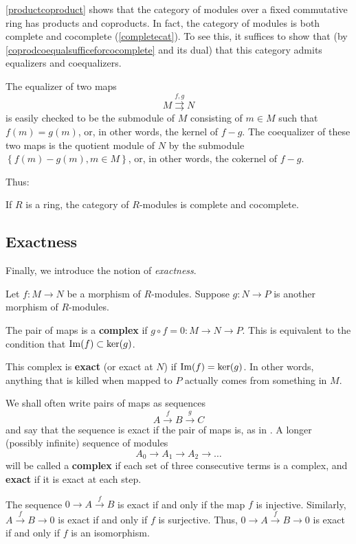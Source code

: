 \cref{productcoproduct} shows that the category of modules over a fixed
commutative ring has products and coproducts. In fact, the category of modules
is both complete and cocomplete (\cref{completecat}).
To see this, it suffices to show that (by
\cref{coprodcoequalsufficeforcocomplete} and its dual) that this category
admits equalizers and coequalizers.

The equalizer of two maps
\[ M \stackrel{f,g}{\rightrightarrows} N  \]
is easily checked to be the submodule of $M$ consisting of $m \in M$ such that
$f(m) = g(m)$, or, in other words, the kernel of $f-g$. The coequalizer of these two maps is the quotient module of $N$
by the submodule $\left\{f(m) - g(m), m \in M\right\}$, or, in other words,
the cokernel of $f-g$.

Thus:

\begin{proposition} 
If $R$ is a ring, the category of $R$-modules is complete and cocomplete.
\end{proposition} 

\subsection{Exactness}
Finally, we introduce the notion of \emph{exactness}. 
\begin{definition} \label{exactness}
Let $f: M \to N$ be a morphism of $R$-modules.  Suppose $g: N \to P$ is another morphism of
$R$-modules.  

The pair of maps is a \textbf{complex} if $g \circ f = 0: M \to N \to P$.
This is equivalent to the condition that $\operatorname{Im}(f) \subset \ker(g)$. 

This complex is \textbf{exact} (or exact at $N$) if $\operatorname{Im}(f) = \ker(g)$.
In other words, anything that is killed when mapped to $P$ actually comes from something in
$M$. 

\end{definition} 


We shall often write pairs of maps as sequences
\[ A \stackrel{f}{\to} B \stackrel{g}{\to} C  \]
and say that the sequence is exact if the pair of maps is, as in
. A longer (possibly infinite) sequence of modules
\[ A_0 \to A_1 \to A_2 \to \dots  \]
will be called a \textbf{complex} if each set of three
consecutive terms is a complex, and \textbf{exact} if it is exact at each step.

\begin{example} 
The sequence $0 \to A \stackrel{f}{\to} B$ is exact if and only if the map $f$
is injective. Similarly, $A \stackrel{f}{\to} B \to 0$ is exact if and only if
$f$ is surjective. Thus, $0 \to A \stackrel{f}{\to}  B \to 0$ is exact if and
only if $f$ is an isomorphism.
\end{example} 

